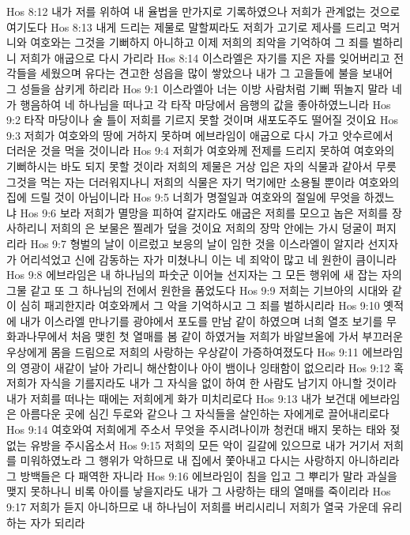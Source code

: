 Hos 8:12  내가 저를 위하여 내 율법을 만가지로 기록하였으나 저희가 관계없는 것으로 여기도다
Hos 8:13  내게 드리는 제물로 말할찌라도 저희가 고기로 제사를 드리고 먹거니와 여호와는 그것을 기뻐하지 아니하고 이제 저희의 죄악을 기억하여 그 죄를 벌하리니 저희가 애굽으로 다시 가리라
Hos 8:14  이스라엘은 자기를 지은 자를 잊어버리고 전각들을 세웠으며 유다는 견고한 성읍을 많이 쌓았으나 내가 그 고을들에 불을 보내어 그 성들을 삼키게 하리라
Hos 9:1  이스라엘아 너는 이방 사람처럼 기뻐 뛰놀지 말라 네가 행음하여 네 하나님을 떠나고 각 타작 마당에서 음행의 값을 좋아하였느니라
Hos 9:2  타작 마당이나 술 틀이 저희를 기르지 못할 것이며 새포도주도 떨어질 것이요
Hos 9:3  저희가 여호와의 땅에 거하지 못하며 에브라임이 애굽으로 다시 가고 앗수르에서 더러운 것을 먹을 것이니라
Hos 9:4  저희가 여호와께 전제를 드리지 못하여 여호와의 기뻐하시는 바도 되지 못할 것이라 저희의 제물은 거상 입은 자의 식물과 같아서 무릇 그것을 먹는 자는 더러워지나니 저희의 식물은 자기 먹기에만 소용될 뿐이라 여호와의 집에 드릴 것이 아님이니라
Hos 9:5  너희가 명절일과 여호와의 절일에 무엇을 하겠느냐
Hos 9:6  보라 저희가 멸망을 피하여 갈지라도 애굽은 저희를 모으고 놉은 저희를 장사하리니 저희의 은 보물은 찔레가 덮을 것이요 저희의 장막 안에는 가시 덩굴이 퍼지리라
Hos 9:7  형벌의 날이 이르렀고 보응의 날이 임한 것을 이스라엘이 알지라 선지자가 어리석었고 신에 감동하는 자가 미쳤나니 이는 네 죄악이 많고 네 원한이 큼이니라
Hos 9:8  에브라임은 내 하나님의 파숫군 이어늘 선지자는 그 모든 행위에 새 잡는 자의 그물 같고 또 그 하나님의 전에서 원한을 품었도다
Hos 9:9  저희는 기브아의 시대와 같이 심히 패괴한지라 여호와께서 그 악을 기억하시고 그 죄를 벌하시리라
Hos 9:10  옛적에 내가 이스라엘 만나기를 광야에서 포도를 만남 같이 하였으며 너희 열조 보기를 무화과나무에서 처음 맺힌 첫 열매를 봄 같이 하였거늘 저희가 바알브올에 가서 부끄러운 우상에게 몸을 드림으로 저희의 사랑하는 우상같이 가증하여졌도다
Hos 9:11  에브라임의 영광이 새같이 날아 가리니 해산함이나 아이 뱀이나 잉태함이 없으리라
Hos 9:12  혹 저희가 자식을 기를지라도 내가 그 자식을 없이 하여 한 사람도 남기지 아니할 것이라 내가 저희를 떠나는 때에는 저희에게 화가 미치리로다
Hos 9:13  내가 보건대 에브라임은 아름다운 곳에 심긴 두로와 같으나 그 자식들을 살인하는 자에게로 끌어내리로다
Hos 9:14  여호와여 저희에게 주소서 무엇을 주시려나이까 청컨대 배지 못하는 태와 젖 없는 유방을 주시옵소서
Hos 9:15  저희의 모든 악이 길갈에 있으므로 내가 거기서 저희를 미워하였노라 그 행위가 악하므로 내 집에서 쫓아내고 다시는 사랑하지 아니하리라 그 방백들은 다 패역한 자니라
Hos 9:16  에브라임이 침을 입고 그 뿌리가 말라 과실을 맺지 못하나니 비록 아이를 낳을지라도 내가 그 사랑하는 태의 열매를 죽이리라
Hos 9:17  저희가 듣지 아니하므로 내 하나님이 저희를 버리시리니 저희가 열국 가운데 유리하는 자가 되리라

